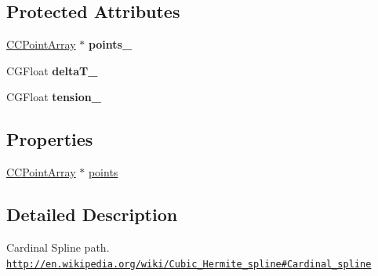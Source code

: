 \subsection*{Protected Attributes}
\begin{DoxyCompactItemize}
\item 
\hypertarget{interface_c_c_cardinal_spline_to_ac932f71ff3bd127c0c414bef9bc33290}{\hyperlink{interface_c_c_point_array}{C\-C\-Point\-Array} $\ast$ {\bfseries points\-\_\-}}\label{interface_c_c_cardinal_spline_to_ac932f71ff3bd127c0c414bef9bc33290}

\item 
\hypertarget{interface_c_c_cardinal_spline_to_ac3c676a4e25fe0202576efa42484f98a}{C\-G\-Float {\bfseries delta\-T\-\_\-}}\label{interface_c_c_cardinal_spline_to_ac3c676a4e25fe0202576efa42484f98a}

\item 
\hypertarget{interface_c_c_cardinal_spline_to_ab1f39c734249c14d9481f9be9f93c111}{C\-G\-Float {\bfseries tension\-\_\-}}\label{interface_c_c_cardinal_spline_to_ab1f39c734249c14d9481f9be9f93c111}

\end{DoxyCompactItemize}
\subsection*{Properties}
\begin{DoxyCompactItemize}
\item 
\hyperlink{interface_c_c_point_array}{C\-C\-Point\-Array} $\ast$ \hyperlink{interface_c_c_cardinal_spline_to_a580b5c52ae10ea8a920fcf1550bbf731}{points}
\end{DoxyCompactItemize}


\subsection{Detailed Description}
Cardinal Spline path. \href{http://en.wikipedia.org/wiki/Cubic_Hermite_spline#Cardinal_spline}{\tt http\-://en.\-wikipedia.\-org/wiki/\-Cubic\-\_\-\-Hermite\-\_\-spline\#\-Cardinal\-\_\-spline} 

